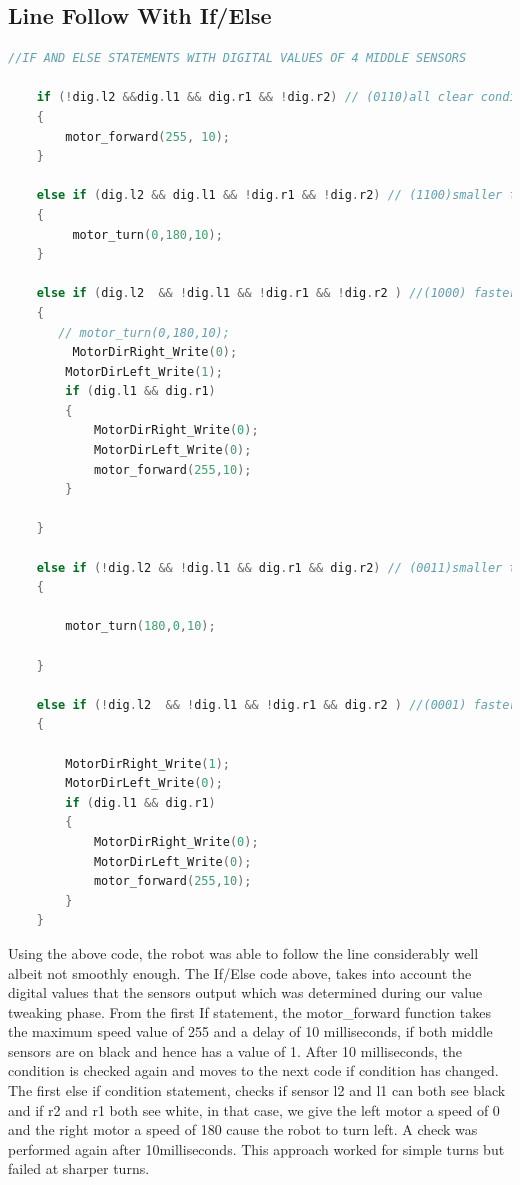 \documentclass[11pt,a4paper,oneside,article]{memoir}
\begin{document}
\subsection{Line Follow With If/Else}
\vspace{-22pt}\begin{lstlisting}[language=C,caption={If/Else Line Follow},label=follow.c] 
 //IF AND ELSE STATEMENTS WITH DIGITAL VALUES OF 4 MIDDLE SENSORS
       
    if (!dig.l2 &&dig.l1 && dig.r1 && !dig.r2) // (0110)all clear condition
    {
        motor_forward(255, 10);
    }
    
    else if (dig.l2 && dig.l1 && !dig.r1 && !dig.r2) // (1100)smaller turn here to the left
    {
         motor_turn(0,180,10);
    }
    
    else if (dig.l2  && !dig.l1 && !dig.r1 && !dig.r2 ) //(1000) faster turn to the left
    {
       // motor_turn(0,180,10);
         MotorDirRight_Write(0);
        MotorDirLeft_Write(1);
        if (dig.l1 && dig.r1)
        {
            MotorDirRight_Write(0);
            MotorDirLeft_Write(0);
            motor_forward(255,10);
        }
        
    }
    
    else if (!dig.l2 && !dig.l1 && dig.r1 && dig.r2) // (0011)smaller turn here to the right
    {
        
        motor_turn(180,0,10);
        
    }
    
    else if (!dig.l2  && !dig.l1 && !dig.r1 && dig.r2 ) //(0001) faster turn to the right
    {
       
        MotorDirRight_Write(1);
        MotorDirLeft_Write(0);
        if (dig.l1 && dig.r1)
        {
            MotorDirRight_Write(0);
            MotorDirLeft_Write(0);
            motor_forward(255,10);
        }
    } 
\end{lstlisting}\vspace{-22pt}
Using the above code, the robot was able to follow the line considerably well albeit not smoothly enough. The If/Else code above, takes into account the digital values that the sensors output which was determined during our value tweaking phase. From the first If statement, the motor\_forward function takes the maximum speed value of 255 and a delay of 10 milliseconds, if both middle sensors are on black and hence has a value of 1. After 10 milliseconds, the condition is checked again and moves to the next code if condition has changed. 
The first else if condition statement, checks if sensor l2 and l1  can both see black and if r2 and r1 both see white, in that case, we give the left motor a speed of 0 and the right motor a speed of 180 cause the robot to turn left. A  check was performed again after 10milliseconds. This approach worked for simple turns but failed at sharper turns. 
\end{document}
